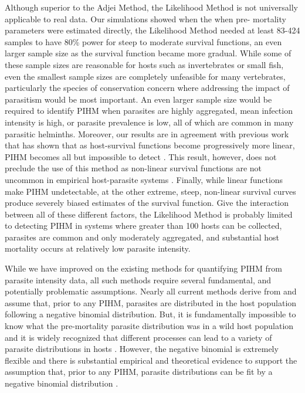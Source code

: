 \documentclass[12pt, a4paper]{article}
\begin{document}
Although superior to the Adjei Method, the Likelihood Method is not universally applicable to real data.  Our simulations showed when the when pre-
mortality parameters were estimated directly, the Likelihood Method needed at
least 83-424 samples to have 80\% power for steep to moderate survival functions, an even larger sample size as the survival function became more gradual. While some of these sample sizes are reasonable for hosts such as invertebrates or small fish, even the smallest sample sizes are completely
unfeasible for many vertebrates, particularly the species of conservation
concern where addressing the impact of parasitism would be most important. An
even larger sample size would be required to identify PIHM when parasites are highly aggregated, mean infection intensity is
high, or parasite prevalence is low, all of which are
common in many parasitic helminths.  Moreover, our results are in agreement with previous work that has shown that as host-survival functions become progressively more linear, PIHM becomes all but impossible to detect \citep{Lanciani1989}.  This result, however, does not preclude the use of this method as non-linear survival functions
are not uncommon in empirical host-parasite systems \citep{Benesh2011}.  Finally,
while linear functions make PIHM undetectable, at the other extreme, steep,
non-linear survival curves produce severely biased estimates of the survival
function. Give the interaction between all of these different factors, the
Likelihood Method is probably limited to detecting PIHM in systems where greater than 100 hosts can be collected, parasites are
common and only moderately aggregated, and substantial host mortality occurs at relatively low parasite intensity.

While we have improved on the existing methods for quantifying
PIHM from parasite intensity data, all such methods require several
fundamental, and potentially problematic assumptions.  Nearly all current methods derive from \cite{Crofton1971a} \citep[but see][]{Ferguson2011} and assume that, prior to any PIHM, parasites are distributed in the host population following a
negative binomial distribution. But, it is fundamentally impossible to know
what the pre-mortality parasite distribution was in a wild host population and
it is widely recognized that different processes can lead to a variety of
parasite distributions in hosts \citep{Anderson1982a, Duerr2003}. However, the negative binomial is extremely
flexible and there is substantial empirical and theoretical evidence to support
the assumption that, prior to any PIHM, parasite distributions can be fit by a negative binomial distribution \citep{Shaw1995,Shaw1998,Wilson2002}.
\end{document}
